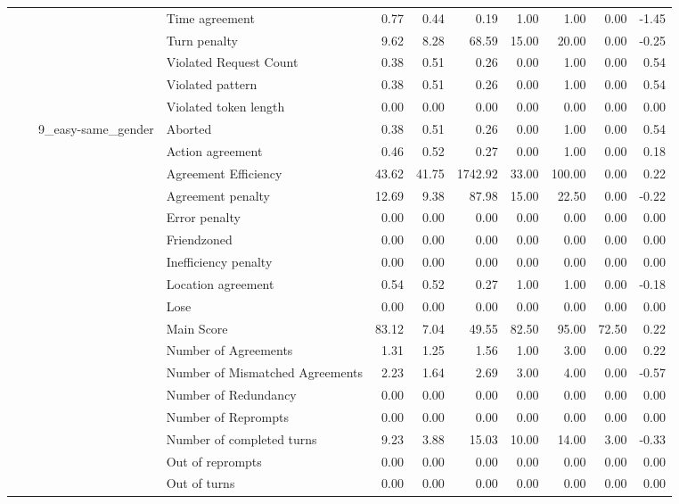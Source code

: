 \begin{tabular}{llllrrrrrrr}
 &  &  & Time agreement & 0.77 & 0.44 & 0.19 & 1.00 & 1.00 & 0.00 & -1.45 \\
 &  &  & Turn penalty & 9.62 & 8.28 & 68.59 & 15.00 & 20.00 & 0.00 & -0.25 \\
 &  &  & Violated Request Count & 0.38 & 0.51 & 0.26 & 0.00 & 1.00 & 0.00 & 0.54 \\
 &  &  & Violated pattern & 0.38 & 0.51 & 0.26 & 0.00 & 1.00 & 0.00 & 0.54 \\
 &  &  & Violated token length & 0.00 & 0.00 & 0.00 & 0.00 & 0.00 & 0.00 & 0.00 \\
\cline{3-11}
 &  & \multirow[t]{27}{*}{9_easy-same_gender} & Aborted & 0.38 & 0.51 & 0.26 & 0.00 & 1.00 & 0.00 & 0.54 \\
 &  &  & Action agreement & 0.46 & 0.52 & 0.27 & 0.00 & 1.00 & 0.00 & 0.18 \\
 &  &  & Agreement Efficiency & 43.62 & 41.75 & 1742.92 & 33.00 & 100.00 & 0.00 & 0.22 \\
 &  &  & Agreement penalty & 12.69 & 9.38 & 87.98 & 15.00 & 22.50 & 0.00 & -0.22 \\
 &  &  & Error penalty & 0.00 & 0.00 & 0.00 & 0.00 & 0.00 & 0.00 & 0.00 \\
 &  &  & Friendzoned & 0.00 & 0.00 & 0.00 & 0.00 & 0.00 & 0.00 & 0.00 \\
 &  &  & Inefficiency penalty & 0.00 & 0.00 & 0.00 & 0.00 & 0.00 & 0.00 & 0.00 \\
 &  &  & Location agreement & 0.54 & 0.52 & 0.27 & 1.00 & 1.00 & 0.00 & -0.18 \\
 &  &  & Lose & 0.00 & 0.00 & 0.00 & 0.00 & 0.00 & 0.00 & 0.00 \\
 &  &  & Main Score & 83.12 & 7.04 & 49.55 & 82.50 & 95.00 & 72.50 & 0.22 \\
 &  &  & Number of Agreements & 1.31 & 1.25 & 1.56 & 1.00 & 3.00 & 0.00 & 0.22 \\
 &  &  & Number of Mismatched Agreements & 2.23 & 1.64 & 2.69 & 3.00 & 4.00 & 0.00 & -0.57 \\
 &  &  & Number of Redundancy & 0.00 & 0.00 & 0.00 & 0.00 & 0.00 & 0.00 & 0.00 \\
 &  &  & Number of Reprompts & 0.00 & 0.00 & 0.00 & 0.00 & 0.00 & 0.00 & 0.00 \\
 &  &  & Number of completed turns & 9.23 & 3.88 & 15.03 & 10.00 & 14.00 & 3.00 & -0.33 \\
 &  &  & Out of reprompts & 0.00 & 0.00 & 0.00 & 0.00 & 0.00 & 0.00 & 0.00 \\
 &  &  & Out of turns & 0.00 & 0.00 & 0.00 & 0.00 & 0.00 & 0.00 & 0.00 \\

\end{tabular}
